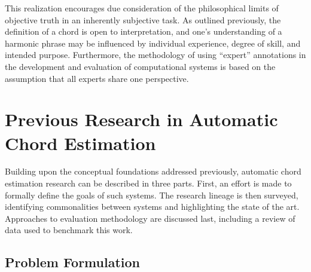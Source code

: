 
This realization encourages due consideration of the philosophical limits of objective truth in an inherently subjective task.
As outlined previously, the definition of a chord is open to interpretation, and one's understanding of a harmonic phrase may be influenced by individual experience, degree of skill, and intended purpose.
Furthermore, the methodology of using ``expert'' annotations in the development and evaluation of computational systems is based on the assumption that all experts share one perspective.


\section{Previous Research in Automatic Chord Estimation}
\label{sec:background}

Building upon the conceptual foundations addressed previously, automatic chord estimation research can be described in three parts.
First, an effort is made to formally define the goals of such systems.
The research lineage is then surveyed, identifying commonalities between systems and highlighting the state of the art.
Approaches to evaluation methodology are discussed last, including a review of data used to benchmark this work.


\subsection{Problem Formulation}
\label{subsec:problem_formulation}

